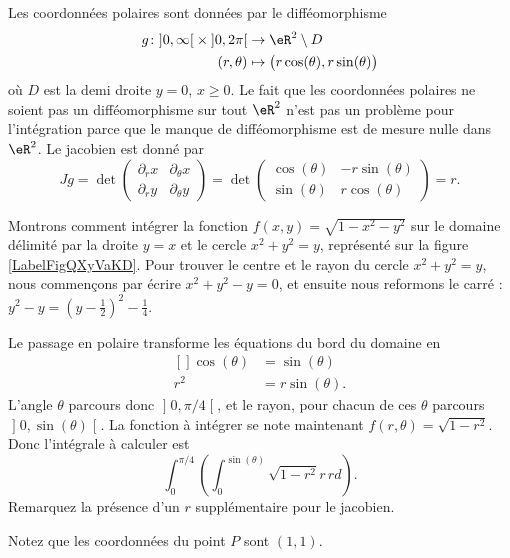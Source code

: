 Les coordonnées polaires sont données par le difféomorphisme
\begin{equation}
	\begin{aligned}
		g\colon \mathopen]0,\infty\mathclose[\times\mathopen]0,2\pi\mathclose[ &\to\eR^2\setminus D\\
		(r,\theta)&\mapsto \big( r\cos(\theta),r\sin(\theta) \big)
	\end{aligned}
\end{equation}
où $D$ est la demi droite $y=0$, $x\geq 0$. Le fait que les coordonnées polaires ne soient pas un difféomorphisme sur tout $\eR^2$ n'est pas un problème pour l'intégration parce que le manque de difféomorphisme est de mesure nulle dans $\eR^2$. Le jacobien est donné par
\begin{equation}
	Jg=\det\begin{pmatrix}
	\partial_rx	&	\partial_{\theta}x	\\ 
	\partial_ry	&	\partial_{\theta}y
\end{pmatrix}=\det\begin{pmatrix}
	\cos(\theta)	&	-r\sin(\theta)	\\ 
	\sin(\theta)	&	r\cos(\theta)	
\end{pmatrix}=r.
\end{equation}

\begin{example}    
    Montrons comment intégrer la fonction $f(x,y)=\sqrt{1-x^2-y^2}$ sur le domaine délimité par la droite $y=x$ et le cercle $x^2+y^2=y$, représenté sur la figure \ref{LabelFigQXyVaKD}. Pour trouver le centre et le rayon du cercle $x^2+y^2=y$, nous commençons par écrire $x^2+y^2-y=0$, et ensuite nous reformons le carré : $y^2-y=(y-\frac{ 1 }{2})^2-\frac{1}{ 4 }$.
    \newcommand{\CaptionFigQXyVaKD}{Passage en polaire pour intégrer sur un morceau de cercle.}


    Le passage en polaire transforme les équations du bord du domaine en
    \begin{equation}
        \begin{aligned}[]
            \cos(\theta)&=\sin(\theta)\\
            r^2&=r\sin(\theta).
        \end{aligned}
    \end{equation}
    L'angle $\theta$ parcours donc $\mathopen] 0 , \pi/4 \mathclose[$, et le rayon, pour chacun de ces $\theta$ parcours $\mathopen] 0 , \sin(\theta) \mathclose[$. La fonction à intégrer se note maintenant $f(r,\theta)=\sqrt{1-r^2}$. Donc l'intégrale à calculer est
    \begin{equation}		\label{PgRapIntMultFubiniBoutCercle}
        \int_{0}^{\pi/4}\left( \int_0^{\sin(\theta)}\sqrt{1-r^2}r\,rd \right).
    \end{equation}
    Remarquez la présence d'un $r$ supplémentaire pour le jacobien.

    Notez que les coordonnées du point $P$ sont $(1,1)$.
\end{example}


